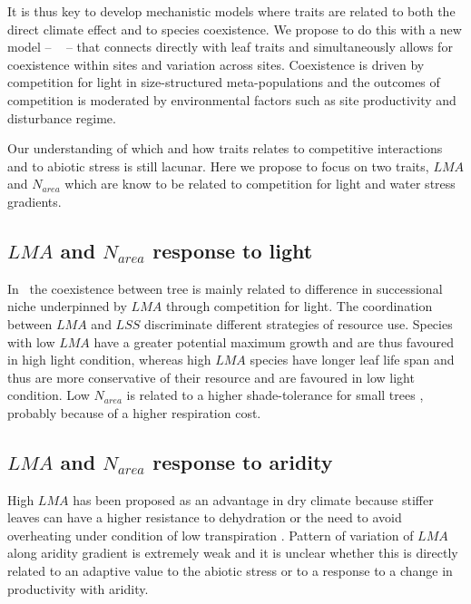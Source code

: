 \documentclass[a4paper,11pt]{article}
\begin{document}
It is thus key to develop mechanistic models where traits are related
to both the direct climate effect and to species coexistence. We propose to do this with a new model -- \plant\
\citep{Falster-2016,Falster-2017} -- that connects directly with leaf
traits and simultaneously allows for coexistence within sites and
variation across sites. Coexistence is driven by competition for light
in size-structured meta-populations and the outcomes of competition is
moderated by environmental factors such as site productivity and disturbance regime.

Our understanding of which and how traits relates to competitive interactions and to abiotic stress is still lacunar. Here we propose to focus on two traits,  $LMA$ and $N_{area}$ which are know to be related to competition for light and water stress gradients.

\subsection{$LMA$ and $N_{area}$ response to light}
 In \plant\ the coexistence between tree is mainly related to difference in successional niche underpinned by $LMA$ through competition for light. The coordination between $LMA$ and $LSS$ discriminate different strategies of resource use. Species with low $LMA$ have a greater potential maximum growth and are thus favoured in high light condition, whereas high $LMA$ species have longer leaf life span and thus are more conservative of their resource and are favoured in low light condition. Low $N_{area}$ is related to a higher shade-tolerance for small trees \citep{Falster-2018}, probably because of a higher respiration cost.

\subsection{$LMA$ and $N_{area}$ response to aridity}

High $LMA$ has been proposed as an advantage in dry climate because
stiffer leaves can have a higher resistance to dehydration
\citep{Wright-2002a,Wright-2002b} or the need to avoid overheating
under condition of low transpiration \citep{Leigh-2012}.
Pattern of variation of $LMA$ along aridity gradient is extremely weak and it is unclear whether this is directly related to an adaptive value to the abiotic stress or to a response to a change in productivity with aridity.
 
\end{document}
